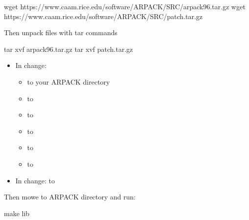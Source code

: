 \documentclass[letterpaper,10pt,english]{sphinxmanual}
\begin{document}
\begin{sphinxVerbatim}[commandchars=\\\{\}]
wget https://www.caam.rice.edu/software/ARPACK/SRC/arpack96.tar.gz
wget https://www.caam.rice.edu/software/ARPACK/SRC/patch.tar.gz
\end{sphinxVerbatim}

Then unpack files with tar commands

\begin{sphinxVerbatim}[commandchars=\\\{\}]
tar xvf arpack96.tar.gz
tar xvf patch.tar.gz
\end{sphinxVerbatim}
\begin{itemize}
\item {} 
In  change:
\begin{itemize}
\item {} 
 to your ARPACK directory

\item {} 
 to 

\item {} 
 to 

\item {} 
 to 

\item {} 
 to 

\item {} 
 to 

\end{itemize}

\item {} 
In  change:  to 

\end{itemize}

Then mowe to ARPACK directory and run:

\begin{sphinxVerbatim}[commandchars=\\\{\}]
make lib   
\end{sphinxVerbatim}
\end{document}
